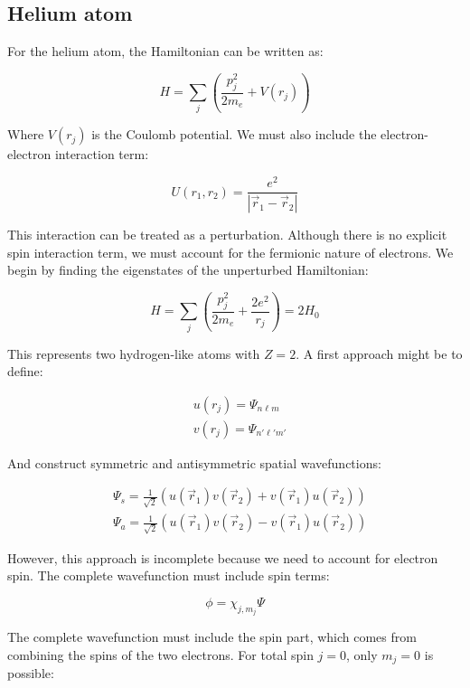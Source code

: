 \documentclass[italian]{HKNdocument}
\begin{document}
\subsection{Helium atom}
For the helium atom, the Hamiltonian can be written as:

\begin{equation}
H=\sum_j(\frac{p_j^2}{2m_e}+V(r_j))
\end{equation}

Where $V(r_j)$ is the Coulomb potential. We must also include the electron-electron interaction term:

\begin{equation}
U(r_1,r_2)=\frac{e^2}{|\vec{r}_1-\vec{r}_2|}
\end{equation}

This interaction can be treated as a perturbation. Although there is no explicit spin interaction term, we must account for the fermionic nature of electrons. We begin by finding the eigenstates of the unperturbed Hamiltonian:

\begin{equation}
H=\sum_j(\frac{p_j^2}{2m_e}+\frac{2e^2}{r_j})=2H_0
\end{equation}

This represents two hydrogen-like atoms with $Z=2$. A first approach might be to define:

\begin{align}
&u(r_j)=\Psi_{n\ell m} \\
&v(r_j)=\Psi_{n'\ell'm'}
\end{align}

And construct symmetric and antisymmetric spatial wavefunctions:

\begin{align}
&\Psi_s=\frac{1}{\sqrt{2}}(u(\vec{r}_1)v(\vec{r}_2)+v(\vec{r}_1)u(\vec{r}_2)) \\
&\Psi_a=\frac{1}{\sqrt{2}}(u(\vec{r}_1)v(\vec{r}_2)-v(\vec{r}_1)u(\vec{r}_2))
\end{align}

However, this approach is incomplete because we need to account for electron spin. The complete wavefunction must include spin terms:

\begin{equation}
\phi=\chi_{j,m_j}\Psi
\end{equation}


The complete wavefunction must include the spin part, which comes from combining the spins of the two electrons. For total spin $j=0$, only $m_j=0$ is possible:
\end{document}
